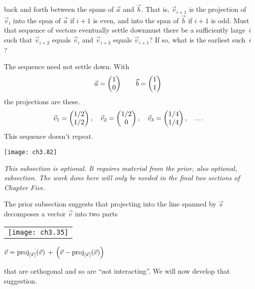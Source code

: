 \begin{exercises}
    back and forth between the spans of $\vec{a}$ and $\vec{b}$.
    That is, $\vec{v}_{i+1}$ is the projection of $\vec{v}_i$ into the
    span of $\vec{a}$ if $i+1$ is even, and  
    into the span of $\vec{b}$ if $i+1$ is odd.
    Must that sequence of vectors eventually settle down\Dash must
    there be a sufficiently large~$i$ such that 
    \( \vec{v}_{i+2} \) equals \( \vec{v}_{i} \) 
    and \( \vec{v}_{i+3} \) equals \( \vec{v}_{i+1} \)?
    If so, what is the earliest such~$i$?
    \begin{answer}
      The sequence need not settle down.
      With
      \begin{equation*}
        \vec{a}=\colvec{1 \\ 0}
        \qquad
        \vec{b}=\colvec{1 \\ 1}
      \end{equation*}
      the projections are these.
      \begin{equation*}
        \vec{v}_1=\colvec{1/2 \\ 1/2},
        \quad
        \vec{v}_2=\colvec{1/2 \\ 0},
        \quad
        \vec{v}_3=\colvec{1/4 \\ 1/4},
        \quad
        \ldots
      \end{equation*}
      This sequence doesn't repeat.
      \begin{center}  \small
        \texttt{[image: ch3.82]}
      \end{center}
      \end{answer}
\end{exercises}
















\noindent\textit{This subsection is optional.
     It requires material from the prior, also optional, subsection.
     The work done here will only be needed in the final two sections
     of Chapter Five.}

The prior subsection suggests 
that projecting into the line spanned by \( \vec{s} \)
decomposes a vector $\vec{v}$ into two parts
\begin{center}  \small
  \begin{tabular}{@{}c@{}}\texttt{[image: ch3.35]}\end{tabular}
   \qquad
   $\displaystyle \vec{v}=\proj{\vec{v}}{\spanof{\vec{s}\,}}
             \,+\,\left(\vec{v}-\proj{\vec{v}}{\spanof{\vec{s}\,}}\right)$
\end{center}
that are orthogonal and so are ``not interacting''.
We will now develop that suggestion.

